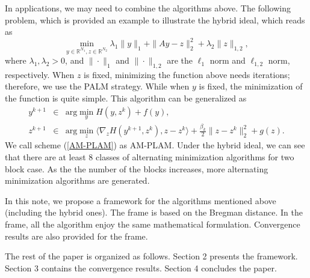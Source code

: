 \documentclass[12pt]{article}
\begin{document}
In applications, we may need to combine the algorithms above. The following problem, which is provided an example to illustrate the hybrid ideal, which reads as
\begin{equation}\label{problem2}
    \min_{y\in \mathbb{R}^{N_1}, z\in \mathbb{R}^{N_2}}\lambda_1\|y\|_1+\|Ay-z\|_2^2+\lambda_2\|z\|_{1,2},
\end{equation}
where $\lambda_1,\lambda_2>0$, and $\|\cdot\|_1$  and $\|\cdot\|_{1,2}$ are the $\ell_1$ norm and $\ell_{1,2}$ norm, respectively. When $z$ is fixed, minimizing the function above needs iterations; therefore, we use the PALM strategy. While when $y$ is fixed, the minimization  of the function is quite simple. This algorithm can be generalized as
 \begin{eqnarray}\label{AM-PLAM}
y^{k+1}&\in& \textrm{arg}\min_{y} H(y,z^k)+f(y),\nonumber\\
z^{k+1}&\in& \textrm{arg}\min_{z} \langle\nabla_z H(y^{k+1},z^k),z-z^k\rangle+\frac{\beta_k}{2}\|z-z^k\|_2^2+g(z).\nonumber
\end{eqnarray}
We call scheme (\ref{AM-PLAM}) as AM-PLAM. Under the hybrid  ideal, we can see that there are at least 8 classes of alternating minimization algorithms for two block case. As the the number of the blocks increases, more   alternating minimization algorithms  are generated.

In this note, we propose a framework for the algorithms mentioned above (including the hybrid ones). The frame is based on the Bregman distance. In the frame, all the algorithm enjoy the same mathematical formulation. Convergence results are also provided for the frame.

The rest of the paper is organized as follows. Section 2 presents the framework. Section 3 contains the convergence results. Section 4 concludes the paper.
\end{document}
